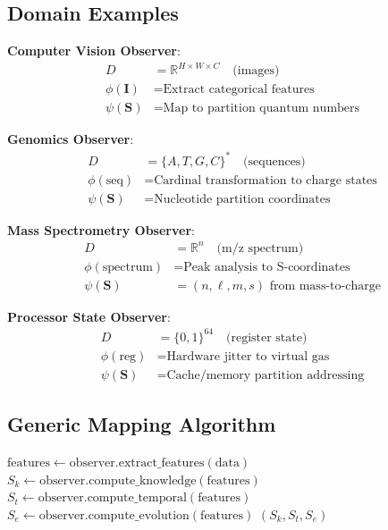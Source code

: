 \documentclass[twocolumn,10pt]{article}
\begin{document}
\subsection{Domain Examples}

\textbf{Computer Vision Observer}:
\begin{align}
D &= \mathbb{R}^{H \times W \times C} \quad \text{(images)} \\
\phi(\mathbf{I}) &= \text{Extract categorical features} \\
\psi(\mathbf{S}) &= \text{Map to partition quantum numbers}
\end{align}

\textbf{Genomics Observer}:
\begin{align}
D &= \{A, T, G, C\}^* \quad \text{(sequences)} \\
\phi(\text{seq}) &= \text{Cardinal transformation to charge states} \\
\psi(\mathbf{S}) &= \text{Nucleotide partition coordinates}
\end{align}

\textbf{Mass Spectrometry Observer}:
\begin{align}
D &= \mathbb{R}^n \quad \text{(m/z spectrum)} \\
\phi(\text{spectrum}) &= \text{Peak analysis to S-coordinates} \\
\psi(\mathbf{S}) &= (n, \ell, m, s) \text{ from mass-to-charge}
\end{align}

\textbf{Processor State Observer}:
\begin{align}
D &= \{0,1\}^{64} \quad \text{(register state)} \\
\phi(\text{reg}) &= \text{Hardware jitter to virtual gas} \\
\psi(\mathbf{S}) &= \text{Cache/memory partition addressing}
\end{align}

\subsection{Generic Mapping Algorithm}

\begin{algorithm}
\caption{Domain to S-Space Mapping}
\begin{algorithmic}[1]
    \State $\text{features} \gets \text{observer.extract\_features}(\text{data})$
    \State $S_k \gets \text{observer.compute\_knowledge}(\text{features})$
    \State $S_t \gets \text{observer.compute\_temporal}(\text{features})$
    \State $S_e \gets \text{observer.compute\_evolution}(\text{features})$
    \State \Return $(S_k, S_t, S_e)$
\EndProcedure
\end{algorithmic}
\end{algorithm}
\end{document}
